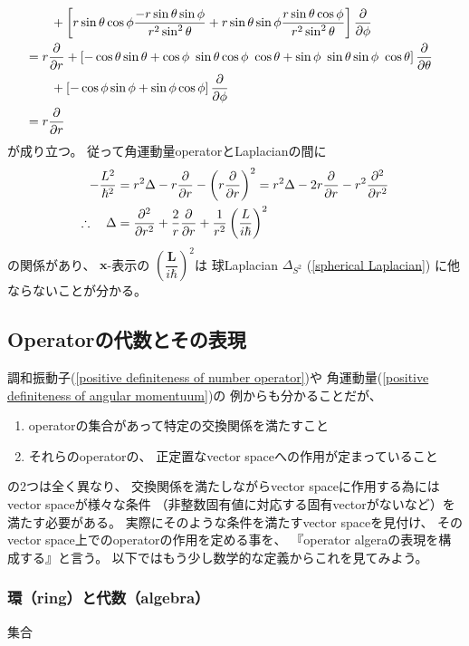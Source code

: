 \begin{align}
\notag\\&\qquad
    +
    \left[
        r \sin \theta \cos \phi
        \dfrac{
            - r \sin \theta
            \sin \phi
        }{ r^2 \sin^2 \theta }
    +
        r \sin \theta \sin \phi
        \dfrac{
            r \sin \theta
            \cos \phi
        }{
            r^2 \sin^2 \theta
        }
    \right]
    \dfrac{\partial}{\partial \phi}
\notag\\&
=
    r
    \dfrac{\partial}{\partial r}
    +
    \left[
        - \cos \theta
        \sin \theta
    +
        \cos \phi\ 
            \sin \theta \cos \phi\ 
            \cos \theta
    +
        \sin \phi\ 
            \sin \theta \sin \phi\ 
            \cos \theta
    \right]
    \dfrac{\partial}{\partial \theta}
\notag\\&\qquad
    +
    \left[
        - \cos \phi
        \sin \phi
    +
        \sin \phi
        \cos \phi
    \right]
    \dfrac{\partial}{\partial \phi}
\notag\\&
=
    r \dfrac{\partial}{\partial r}
\end{align}
が成り立つ。
従って角運動量operatorとLaplacianの間に
\begin{align}
    - \dfrac{L^2}{\hbar^2}
&=
    r^2 \Delta
    -
        r \dfrac{\partial}{\partial r}
    -
        \left(
            r \dfrac{\partial}{\partial r}
        \right)^2
=
    r^2 \Delta
    -
        2 r
        \dfrac{\partial}{\partial r}
    -
        r^2
        \dfrac{\partial^2}{\partial r^2}
\notag\\\therefore
\quad
    \Delta
&=
    \dfrac{\partial^2}{\partial r^2}
    +
    \dfrac{2}{r}
    \dfrac{\partial}{\partial r}
    +
    \dfrac{1}{r^2}
    \left(
        \dfrac{L}{i \hbar}
    \right)^2
\end{align}
の関係があり、
$\bm{x}$-表示の
$\left(
    \dfrac{\bm{L}}{i \hbar}
\right)^2$は
球Laplacian $\Delta_{S^2}$
(\ref{spherical Laplacian})
に他ならないことが分かる。

\subsection{Operatorの代数とその表現}

調和振動子(\ref{positive definiteness of number operator})や
角運動量(\ref{positive definiteness of angular momentuum})の
例からも分かることだが、
\begin{enumerate}
    \item operatorの集合があって特定の交換関係を満たすこと
    \item それらのoperatorの、
        正定置なvector spaceへの作用が定まっていること
\end{enumerate}
の2つは全く異なり、
交換関係を満たしながらvector spaceに作用する為には
vector spaceが様々な条件
（非整数固有値に対応する固有vectorがないなど）を満たす必要がある。
実際にそのような条件を満たすvector spaceを見付け、
そのvector space上でのoperatorの作用を定める事を、
『operator algeraの表現を構成する』と言う。
以下ではもう少し数学的な定義からこれを見てみよう。

\subsubsection{環（ring）と代数（algebra）}

集合
